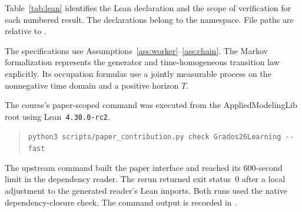 \documentclass[11pt]{article}
\theoremstyle{definition}
\begin{document}
Table~\ref{tab:lean} identifies the Lean declaration and the scope of
verification for each numbered result. The declarations belong to the
 namespace. File paths are relative to
.

The specifications use Assumptions~\ref{ass:worker}--\ref{ass:chain}.
The Markov formalization represents the generator and time-homogeneous
transition law explicitly. Its occupation formulas use a jointly measurable
process on the nonnegative time domain and a positive horizon $T$.

The course's paper-scoped command was executed from the AppliedModelingLib root using Lean~\texttt{4.30.0-rc2}.
\begin{quote}\small
\verb|python3 scripts/paper_contribution.py check Grados26Learning --fast|
\end{quote}
The upstream command built the paper interface and reached its 600-second limit in the dependency reader. The rerun returned exit status~0 after a local adjustment to the generated reader's Lean imports. Both runs used the native dependency-closure check. The command output is recorded in
.
\end{document}
